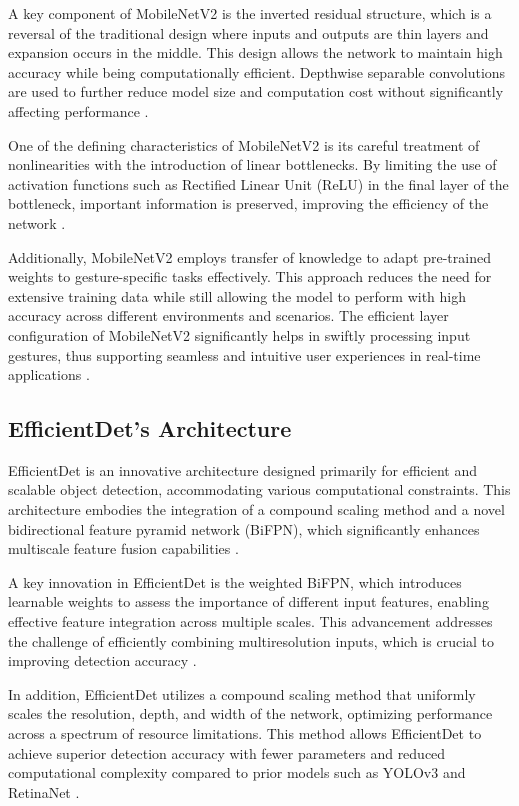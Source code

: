 A key component of MobileNetV2 is the inverted residual structure, which is a reversal of the traditional design where inputs and outputs are thin layers and expansion occurs in the middle. This design allows the network to maintain high accuracy while being computationally efficient. Depthwise separable convolutions are used to further reduce model size and computation cost without significantly affecting performance \cite{mobilnetv2}.

One of the defining characteristics of MobileNetV2 is its careful treatment of nonlinearities with the introduction of linear bottlenecks. By limiting the use of activation functions such as Rectified Linear Unit (ReLU) in the final layer of the bottleneck, important information is preserved, improving the efficiency of the network \cite{mobilnetv2}.

Additionally, MobileNetV2 employs transfer of knowledge to adapt pre-trained weights to gesture-specific tasks effectively. This approach reduces the need for extensive training data while still allowing the model to perform with high accuracy across different environments and scenarios. The efficient layer configuration of MobileNetV2 significantly helps in swiftly processing input gestures, thus supporting seamless and intuitive user experiences in real-time applications \cite{howard2019searching}.

\subsection{EfficientDet's Architecture}
EfficientDet is an innovative architecture designed primarily for efficient and scalable object detection, accommodating various computational constraints. This architecture embodies the integration of a compound scaling method and a novel bidirectional feature pyramid network (BiFPN), which significantly enhances multiscale feature fusion capabilities \cite{tan2020efficientdet}.

A key innovation in EfficientDet is the weighted BiFPN, which introduces learnable weights to assess the importance of different input features, enabling effective feature integration across multiple scales. This advancement addresses the challenge of efficiently combining multiresolution inputs, which is crucial to improving detection accuracy \cite{tan2020efficientdet}.

In addition, EfficientDet utilizes a compound scaling method that uniformly scales the resolution, depth, and width of the network, optimizing performance across a spectrum of resource limitations. This method allows EfficientDet to achieve superior detection accuracy with fewer parameters and reduced computational complexity compared to prior models such as YOLOv3 and RetinaNet \cite{tan2020efficientdet}.

